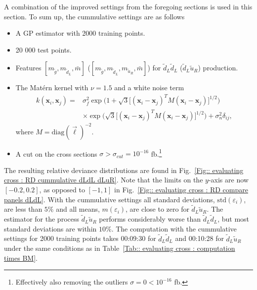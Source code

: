 \documentclass[twoside,english]{uiofysmaster}
\begin{document}
{A combination of the improved settings from the foregoing sections is used in this section. To sum up, the cummulative settings are as follows
\begin{itemize}
\item A GP estimator with 2000 training points.
\item 20 000 test points.
\item Features $[m_{\widetilde{g}}, m_{\widetilde{d}_L}, \bar{m}]$ ($[m_{\widetilde{g}}, m_{\widetilde{d}_L}, m_{\widetilde{u}_R}, \bar{m}]$) for $\widetilde{d}_L \widetilde{d}_L$ ($\widetilde{d}_L \widetilde{u}_R$) production.
\item The Mat\'{e}rn kernel with $\nu=1.5$ and a white noise term
\begin{align}
k (\textbf{x}_i, \textbf{x}_j) =& \sigma_f^2 \exp \Big( 1 + \sqrt{3} \big[ (\textbf{x}_i - \textbf{x}_j)^T M (\textbf{x}_i - \textbf{x}_j) \big]^{1/2} \Big)\\ & \times  \exp \Big( \sqrt{3} \big[ (\textbf{x}_i - \textbf{x}_j)^T M (\textbf{x}_i - \textbf{x}_j) \big]^{1/2} \Big) + \sigma_n^2 \delta_{ij},
\end{align}
where $M = \text{diag}(\vec{\ell})^{-2}$.
\item A cut on the cross sections $\sigma > \sigma_{cut} = 10^{-16}$ fb.\footnote{Effectively also removing the outliers $\sigma = 0 < 10^{-16}$ fb.}
\end{itemize}
The resulting relative deviance distributions are found in Fig.~\ref{Fig:: evaluating cross : RD cummulative dLdL dLuR}. Note that the limits on the $y$-axis are now $[-0.2, 0.2]$, as opposed to $[-1, 1]$ in Fig.~\ref{Fig:: evaluating cross : RD compare panels dLdL}. With the cummulative settings all standard deviations, $\mathrm{std}(\varepsilon_i)$, are less than $5\%$ and all means, $m(\varepsilon_i)$, are close to zero for $\widetilde{d}_L \widetilde{u}_R$. The estimator for the process $\widetilde{d}_L \widetilde{u}_R$ performs considerably worse than $\widetilde{d}_L \widetilde{d}_L$, but most standard deviations are within $10 \%$. The computation with the cummulative settings for 2000 training points takes 00:09:30 for $\widetilde{d}_L \widetilde{d}_L$ and 00:10:28 for $\widetilde{d}_L \widetilde{u}_R$ under the same conditions as in Table~\ref{Tab:: evaluating cross : computation times BM}. 

}
\end{document}

